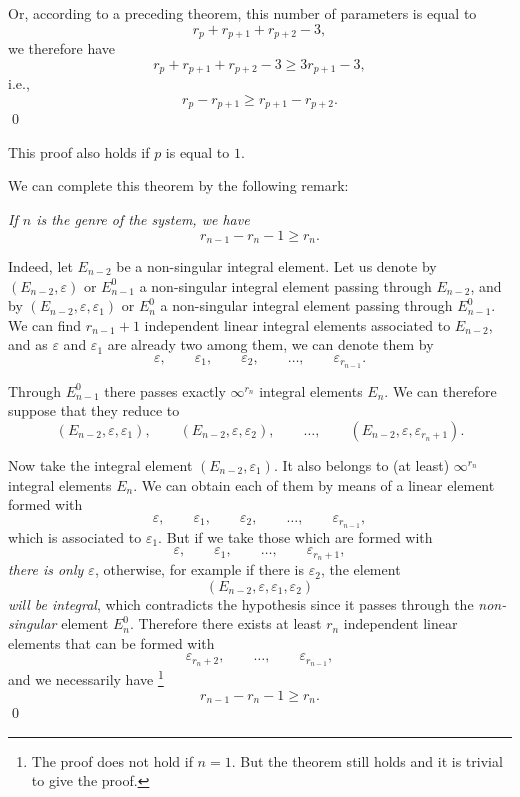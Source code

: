 \documentclass[leqno,11pt]{book}
\makeatletter
\theoremstyle{shape1}
\theoremstyle{shapesmall}
\let\old@epsilon\epsilon
\let\old@varepsilon\varepsilon
\let\epsilon\old@varepsilon
\let\varepsilon\old@epsilon
\newcommand{\somespace}{\vspace{9pt}}
\makeatother
\begin{document}
Or, according to a preceding theorem, this number of parameters is equal to
\[
r_{p}+r_{p+1}+r_{p+2}-3,
\]
we therefore have
\[
r_{p}+r_{p+1}+r_{p+2}-3\ge 3 r_{p+1}-3,
\]
i.e.,
\[
r_{p}-r_{p+1}\ge r_{p+1}-r_{p+2}.
\]
\qed

This proof also holds if $p$ is equal to $1$.

We can complete this theorem by the following remark:

\somespace

\emph{If $n$ is the genre of the system, we have}
\[
r_{n-1}-r_{n}-1\ge r_{n}.
\]

Indeed, let $E_{n-2}$ be a non-singular integral element. Let us denote by $(E_{n-2},\epsilon)$ or $E_{n-1}^{0}$ a non-singular integral element passing through $E_{n-2}$, and by $(E_{n-2},\epsilon,\epsilon_{1})$ or $E_{n}^{0}$ a non-singular integral element passing through $E_{n-1}^{0}$. We can find $r_{n-1}+1$ independent linear integral elements associated to $E_{n-2}$, and as $\epsilon$ and $\epsilon_{1}$ are already two among them, we can denote them by
\[
\epsilon,\qquad\epsilon_{1},\qquad\epsilon_{2},\qquad\dots,\qquad\epsilon_{r_{n-1}}.
\]

Through $E_{n-1}^{0}$ there passes exactly $\infty^{r_{n}}$ integral elements $E_{n}$. We can therefore suppose that they reduce to
\[
(E_{n-2},\epsilon,\epsilon_{1}),\qquad(E_{n-2},\epsilon,\epsilon_{2}),\qquad\dots,\qquad(E_{n-2},\epsilon,\epsilon_{r_{n}+1}).
\]

Now take the integral element $(E_{n-2},\epsilon_{1})$. It also belongs to (at least) $\infty^{r_{n}}$ integral elements $E_{n}$. We can obtain each of them by means of a linear element formed with
\[
\epsilon,\qquad\epsilon_{1},\qquad\epsilon_{2},\qquad\dots,\qquad\epsilon_{r_{n-1}},
\]
which is associated to $\epsilon_{1}$. But if we take those which are formed with
\[
\epsilon,\qquad\epsilon_{1},\qquad\dots,\qquad\epsilon_{r_{n}+1},
\]
\emph{there is only $\epsilon$}, otherwise, for example if there is $\epsilon_{2}$, the element
\[
(E_{n-2},\epsilon,\epsilon_{1},\epsilon_{2})
\]
\emph{will be integral}, which contradicts the hypothesis since it passes through the \emph{non-singular} element $E_{n}^{0}$. Therefore there exists at least $r_{n}$ independent linear elements that can be formed with
\[
\epsilon_{r_{n}+2},\qquad\dots,\qquad\epsilon_{r_{n-1}},
\]
and we necessarily have \footnote{The proof does not hold if $n=1$. But the theorem still holds and it is trivial to give the proof.}
\[
r_{n-1}-r_{n}-1\ge r_{n}.
\]
\qed
\end{document}
